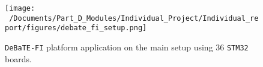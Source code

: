 \begin{figure}[htbp] %
	\centering
	\texttt{[image: ~/Documents/Part\_D\_Modules/Individual\_Project/Individual\_report/figures/debate\_fi\_setup.png]} %
	\caption{\texttt{DeBaTE-FI} platform application on the main setup using 36 \texttt{STM32} boards\cite{debate_fi_publication}.}
	\label{fig:debate_fi_setup} %
\end{figure}